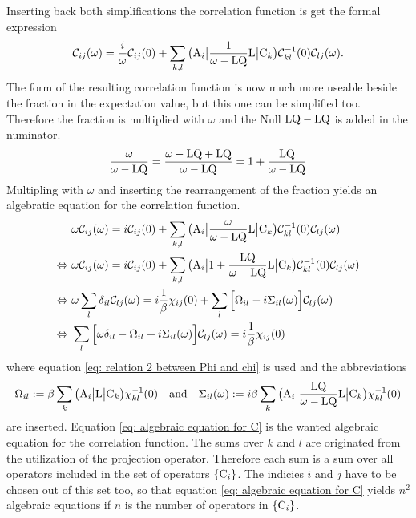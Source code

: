 %
Inserting back both simplifications the correlation function is get the formal expression
%
\begin{align}
	\mathcal{C}_{ij}(\omega) = \frac{i}{\omega} \mathcal{C}_{ij}(0) + \sum\limits_{k,l} \big({\mathrm{A}_{i}}\big| \frac{1}{\omega - \mathrm{LQ}} \mathrm{L} \big|{\mathrm{C}_{k}}\big) \mathcal{C}_{kl}^{-1}(0) \mathcal{C}_{lj}(\omega).
\end{align}
%
The form of the resulting correlation function is now much more useable beside the fraction in the expectation value, but this one can be simplified too.
Therefore the fraction is multiplied with $\omega$ and the Null $\mathrm{LQ} - \mathrm{LQ}$ is added in the numinator.
%
\begin{align}
	\frac{\omega}{\omega - \mathrm{LQ}} = \frac{\omega - \mathrm{LQ} + \mathrm{LQ}}{\omega - \mathrm{LQ}} = 1 + \frac{\mathrm{LQ}}{\omega - \mathrm{LQ}}
\end{align}
%
Multipling with $\omega$ and inserting the rearrangement of the fraction yields an algebratic equation for the correlation function.
%
\begin{align}
	&\omega \mathcal{C}_{ij}(\omega) = i \mathcal{C}_{ij}(0) + \sum\limits_{k,l} \big({\mathrm{A}_{i}}\big| \frac{\omega}{\omega - \mathrm{LQ}} \mathrm{L} \big|{\mathrm{C}_{k}}\big) \mathcal{C}_{kl}^{-1}(0) \mathcal{C}_{lj}(\omega)
	\notag \\
	\Leftrightarrow\ &\omega \mathcal{C}_{ij}(\omega) = i \mathcal{C}_{ij}(0) + \sum\limits_{k,l} \big({\mathrm{A}_{i}}\big| 1 + \frac{\mathrm{LQ}}{\omega - \mathrm{LQ}} \mathrm{L} \big|{\mathrm{C}_{k}}\big) \mathcal{C}_{kl}^{-1}(0) \mathcal{C}_{lj}(\omega)
	\notag \\
	\Leftrightarrow\ &\omega \sum\limits_{l} \delta_{il} \mathcal{C}_{lj}(\omega) = i \frac{1}{\beta} \chi_{ij}(0) + \sum\limits_{l} \Big[\Omega_{il} -i \Sigma_{il}(\omega)\Big]  \mathcal{C}_{lj}(\omega)
	\notag \\
	\Leftrightarrow\ &\sum\limits_{l} \Big[\omega \delta_{il} - \Omega_{il} + i \Sigma_{il}(\omega)\Big] \mathcal{C}_{lj}(\omega) = i \frac{1}{\beta} \chi_{ij}(0)
	\label{eq: algebraic equation for C}
\end{align}
%
where equation \eqref{eq: relation 2 between Phi and chi} is used and the abbreviations
%
\begin{align}
	\Omega_{il} := \beta \sum\limits_{k} \obra{\mt{A}_{i}} \mt{L} \oket{\mt{C}_{k}} \chi_{kl}^{-1}(0)
	\qq{and}
	\Sigma_{il}(\omega) := i \beta \sum\limits_{k} \obra{\mt{A}_{i}} \frac{\mt{LQ}}{\omega - \mt{LQ}} \mt{L} \oket{\mt{C}_{k}} \chi_{kl}^{-1}(0)
\end{align}
%
are inserted.
Equation \eqref{eq: algebraic equation for C} is the wanted algebraic equation for the correlation function.
The sums over $k$ and $l$ are originated from the utilization of the projection operator.
Therefore each sum is a sum over all operators included in the set of operators $\{\mathrm{C}_{i}\}$.
The indicies $i$ and $j$ have to be chosen out of this set too, so that equation \eqref{eq: algebraic equation for C} yields $n^{2}$ algebraic equations if $n$ is the number of operators in $\{\mathrm{C}_{i}\}$.


